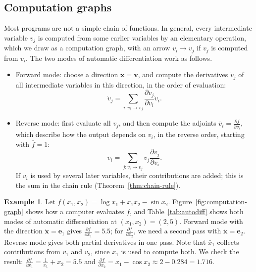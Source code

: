 \documentclass[11pt]{article}
\theoremstyle{definition}
\newtheorem{example}[definition]{Example}
\theoremstyle{plain}
\theoremstyle{remark}
\begin{document}
\subsection{Computation graphs}

Most programs are not a simple chain of functions. In general, every intermediate variable $v_j$ is computed from some earlier variables by an elementary operation, which we draw as a computation graph, with an arrow $v_i \to v_j$ if $v_j$ is computed from $v_i$. The two modes of automatic differentiation work as follows.
\begin{itemize}
    \item Forward mode: choose a direction $\dot{\mathbf{x}} = \mathbf{v}$, and compute the derivatives $\dot v_j$ of all intermediate variables in this direction, in the order of evaluation:
    \[\dot v_j = \sum_{i : v_i \to v_j} \frac{\partial v_j}{\partial v_i} \dot v_i.\]
    \item Reverse mode: first evaluate all $v_j$, and then compute the adjoints $\bar v_i = \frac{\partial f}{\partial v_i}$, which describe how the output depends on $v_i$, in the reverse order, starting with $\bar f = 1$:
    \[\bar v_i = \sum_{j : v_i \to v_j} \bar v_j \frac{\partial v_j}{\partial v_i}.\]
    If $v_i$ is used by several later variables, their contributions are added; this is the sum in the chain rule (Theorem~\ref{thm:chain-rule}).
\end{itemize}

\begin{example}\label{ex:autodiff}
    Let $f(x_1, x_2) = \log x_1 + x_1 x_2 - \sin x_2$. Figure~\ref{fig:computation-graph} shows how a computer evaluates $f$, and Table~\ref{tab:autodiff} shows both modes of automatic differentiation at $(x_1, x_2) = (2, 5)$. Forward mode with the direction $\dot{\mathbf{x}} = \mathbf{e}_1$ gives $\frac{\partial f}{\partial x_1} = 5.5$; for $\frac{\partial f}{\partial x_2}$, we need a second pass with $\dot{\mathbf{x}} = \mathbf{e}_2$. Reverse mode gives both partial derivatives in one pass. Note that $\bar x_1$ collects contributions from $v_1$ and $v_2$, since $x_1$ is used to compute both. We check the result: $\frac{\partial f}{\partial x_1} = \frac{1}{x_1} + x_2 = 5.5$ and $\frac{\partial f}{\partial x_2} = x_1 - \cos x_2 \approx 2 - 0.284 = 1.716$.
\end{example}
\end{document}
